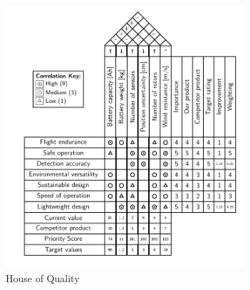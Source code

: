 \begin{figure}[H]
\centering
\includegraphics[width=0.79\textwidth]{figs/Samuel/Figures/test (2).pdf}
\caption{House of Quality}
\label{fig:hoq}
\end{figure}


    
    
    

